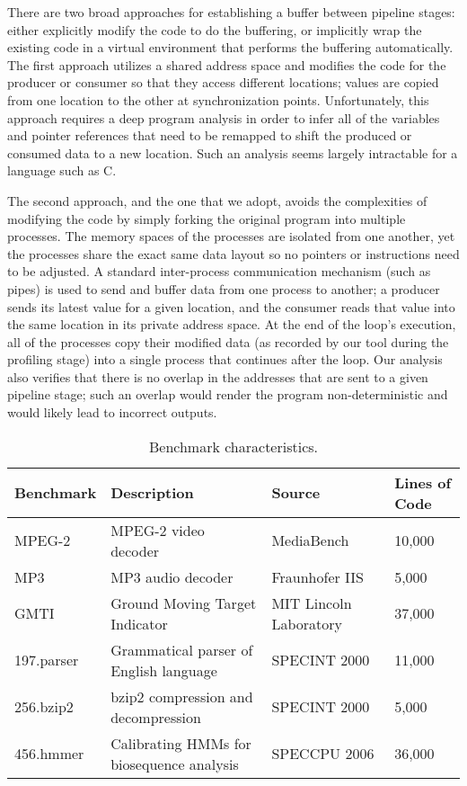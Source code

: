 There are two broad approaches for establishing a buffer between
pipeline stages: either explicitly modify the code to do the
buffering, or implicitly wrap the existing code in a virtual
environment that performs the buffering automatically.  The first
approach utilizes a shared address space and modifies the code for the
producer or consumer so that they access different locations; values
are copied from one location to the other at synchronization points.
Unfortunately, this approach requires a deep program analysis in order
to infer all of the variables and pointer references that need to be
remapped to shift the produced or consumed data to a new location.
Such an analysis seems largely intractable for a language such as C.

The second approach, and the one that we adopt, avoids the
complexities of modifying the code by simply forking the original
program into multiple processes.  The memory spaces of the processes
are isolated from one another, yet the processes share the exact same
data layout so no pointers or instructions need to be adjusted.  A
standard inter-process communication mechanism (such as pipes) is used
to send and buffer data from one process to another; a producer sends
its latest value for a given location, and the consumer reads that
value into the same location in its private address space.  At the end
of the loop's execution, all of the processes copy their modified data
(as recorded by our tool during the profiling stage) into a single
process that continues after the loop.  Our analysis also verifies
that there is no overlap in the addresses that are sent to a given
pipeline stage; such an overlap would render the program
non-deterministic and would likely lead to incorrect outputs.

\begin{table*}[t]
\begin{center}
{\tenpoint
\begin{tabular}{|l|l|l|l|}
\hline
{\bf Benchmark} & {\bf Description} & {\bf Source} & {\bf Lines of Code} \\ \hline \hline
MPEG-2 & MPEG-2 video decoder & MediaBench~\cite{lee97mediabench} & 10,000 \\ \hline
MP3 & MP3 audio decoder & Fraunhofer IIS~\cite{fraunhofer03mp3} & 5,000 \\ \hline
GMTI  & Ground Moving Target Indicator & MIT Lincoln Laboratory~\cite{reuther03gmti} & 37,000\\ \hline
197.parser & Grammatical parser of English language & SPECINT 2000 & 11,000 \\ \hline
256.bzip2 & bzip2 compression and decompression & SPECINT 2000 & 5,000 \\ \hline
456.hmmer & Calibrating HMMs for biosequence analysis & SPECCPU 2006 & 36,000 \\ \hline
\end{tabular}}
\caption{Benchmark characteristics.\protect\label{tab:prof-benchmarks}}
\end{center}
\end{table*}

